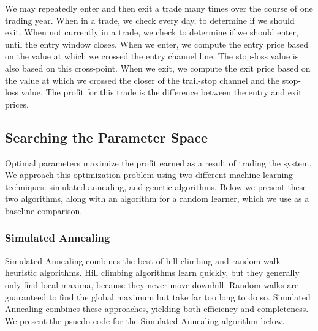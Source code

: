 \documentclass[12pt]{article}
\begin{document}
\pagebreak
We may repeatedly enter and then exit a trade many times over the course of one
trading year. When in a trade, we check every day, to determine if we should
exit.  When not currently in a trade, we check to determine if we should enter,
until the entry window closes. When we enter, we compute the entry price based
on the value at which we crossed the entry channel line. The stop-loss value is
also based on this cross-point. When we exit, we compute the exit price based on
the value at which we crossed the closer of the trail-stop channel and the
stop-loss value. The profit for this trade is the difference between the entry
and exit prices.

\subsection{Searching the Parameter Space}

Optimal parameters maximize the profit earned as a result of trading the
system.  We approach this optimization problem using two different machine
learning techniques: simulated annealing, and genetic algorithms.  Below we
present these two algorithms, along with an algorithm for a random learner,
which we use as a baseline comparison.

\subsubsection{Simulated Annealing}

Simulated Annealing combines the best of hill climbing and random walk
heuristic algorithms.  Hill climbing algorithms learn quickly, but they
generally only find local maxima, because they never move downhill. Random
walks are guaranteed to find the global maximum but take far too long to do so.
Simulated Annealing combines these approaches, yielding both efficiency and
completeness.  We present the psuedo-code for the Simulated Annealing algorithm
below.
\end{document}
